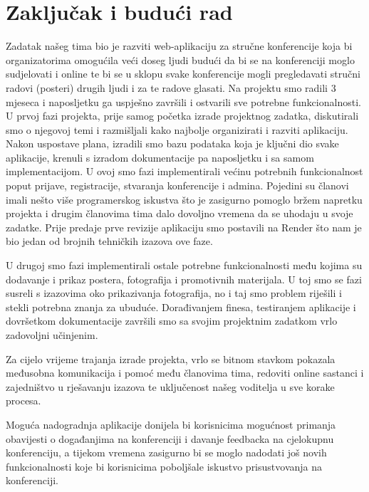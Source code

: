 \chapter{Zaključak i budući rad}
				
		 
		 Zadatak našeg tima bio je razviti web-aplikaciju za stručne konferencije koja bi organizatorima omogućila veći doseg ljudi budući da bi se na konferenciji moglo sudjelovati i online te bi se u sklopu svake konferencije mogli pregledavati stručni radovi (posteri) drugih ljudi i za te radove glasati. Na projektu smo radili 3 mjeseca i naposljetku ga uspješno završili i ostvarili sve potrebne funkcionalnosti.\\
		 
		 U prvoj fazi projekta, prije samog početka izrade projektnog zadatka, diskutirali smo o njegovoj temi i razmišljali kako najbolje organizirati i razviti aplikaciju. Nakon uspostave plana, izradili smo bazu podataka koja je ključni dio svake aplikacije, krenuli s izradom dokumentacije pa naposljetku i sa samom implementacijom. U ovoj smo fazi implementirali većinu potrebnih funkcionalnost poput prijave, registracije, stvaranja konferencije i admina. Pojedini su članovi imali nešto više programerskog iskustva što je zasigurno pomoglo bržem napretku projekta i drugim članovima tima dalo dovoljno vremena da se uhodaju u svoje zadatke. Prije predaje prve revizije aplikaciju smo postavili na Render što nam je bio jedan od brojnih tehničkih izazova ove faze.

		 U drugoj smo fazi implementirali ostale potrebne funkcionalnosti među kojima su dodavanje i prikaz postera, fotografija i promotivnih materijala. U toj smo se fazi susreli s izazovima oko prikazivanja fotografija, no i taj smo problem riješili i stekli potrebna znanja za ubuduće. Dorađivanjem finesa, testiranjem aplikacije i dovršetkom dokumentacije završili smo sa svojim projektnim zadatkom vrlo zadovoljni učinjenim.
		 
		 Za cijelo vrijeme trajanja izrade projekta, vrlo se bitnom stavkom pokazala međusobna komunikacija i pomoć među članovima tima, redoviti online sastanci i zajedništvo u rješavanju izazova te uključenost našeg voditelja u sve korake procesa.
		 
		 Moguća nadogradnja aplikacije donijela bi korisnicima mogućnost primanja obavijesti o događanjima na konferenciji i davanje feedbacka na cjelokupnu konferenciju, a tijekom vremena zasigurno bi se moglo nadodati još novih funkcionalnosti koje bi korisnicima poboljšale iskustvo prisustvovanja na konferenciji.\\
		 
